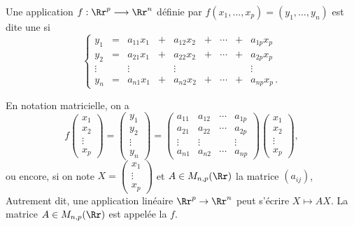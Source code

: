 \documentclass[class=report,crop=false]{standalone}
\begin{document}
\begin{definition}
Une application $f: \Rr^p  \longrightarrow \Rr^n$ définie par $f(x_1, \dots , x_p) = (y_1, \dots , y_n)$
est dite une  si
 $$
 \left\{
\begin{array}{ccccccccc}
y_1 & = &a_{11}x_1 &+ &a_{12} x_2 & + & \cdots & + & a_{1p}x_p\\
y_2 & = & a_{21} x_1 & + & a_{22} x_2 & + & \cdots & + & a_{2p} x_p\\
\vdots &&\vdots &&\vdots & & & &\vdots\\
y_n & = & a_{n1}x_1 & + & a_{n2}x_2 &+&\cdots & +& a_{np} x_p\, .
\end{array}\right.
$$
\end{definition}


En notation matricielle, on a
$$f\begin{pmatrix} x_1\\x_2 \\ \vdots \\x_p \end{pmatrix}=
\begin{pmatrix} y_1\\ y_2\\ \vdots\\ y_n  \end{pmatrix} =
\begin{pmatrix}
a_{11} & a_{12} & \cdots & a_{1p}\\
a_{21} & a_{22} & \cdots & a_{2p}\\
\vdots & \vdots & & \vdots\\
a_{n1}& a_{n2} & \cdots & a_{np}
\end{pmatrix}
\begin{pmatrix} x_1\\x_2 \\ \vdots \\x_p \end{pmatrix},
$$
ou encore, si on note
$X= \begin{pmatrix} x_1\\ \vdots \\x_p \end{pmatrix}$ et
$A \in M_{n,p}(\Rr)$ la matrice $(a_{ij})$,
Autrement dit, une application linéaire $\Rr^p \to \Rr^n$
peut s'écrire $X \mapsto A X$. La matrice $A\in M_{n,p}(\Rr)$ est
appelée la  $f$.
\end{document}
